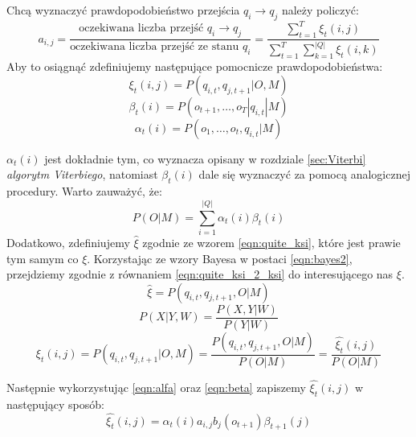 \documentclass[11pt]{article}
\begin{document}
	   Chcą wyznaczyć prawdopodobieństwo przejścia $q_i \rightarrow q_j$ należy policzyć:
	   \begin{equation}
		    a_{i,j}=\frac{\text{oczekiwana liczba przejść } q_i \rightarrow q_j}{\text{oczekiwana liczba przejść ze stanu } q_i} = \frac{\sum_{t=1}^T 	\xi_t(i,j)}{\sum_{t=1}^T \sum_{k=1}^{|Q|}	\xi_t(i,k)}
		    \label{eqn:qi_qj}
	   \end{equation}
	   Aby to osiągnąć zdefiniujemy następujące pomocnicze prawdopodobieństwa:
	   \begin{equation}
			\xi_t(i,j)=P(q_{i,t}, q_{j,t+1}|O,M)
			\label{eqn:ksi}
	   \end{equation}
	   \begin{equation}
	   	    \beta_t(i)=P(o_{t+1}, \ldots, o_T|q_{i,t}|M)
	   	    \label{eqn:beta}
	   \end{equation}
	   \begin{equation}
			\alpha_t(i)=P(o_1, \ldots, o_{t},q_{i,t}|M)
			\label{eqn:alfa}
	   \end{equation}
	   
	   $\alpha_t(i)$ jest dokładnie tym, co wyznacza opisany w rozdziale \ref{sec:Viterbi} \textit{algorytm Viterbiego}, natomiast $\beta_t(i)$ dale się wyznaczyć za pomocą analogicznej procedury. Warto zauważyć, że:
	   \begin{equation}
		   P(O|M) = \sum_{i=1}^{|Q|}\alpha_t(i)\beta_t(i)
	   \end{equation}
	   Dodatkowo, zdefiniujemy $\hat{\xi}$ zgodnie ze wzorem \ref{eqn:quite_ksi}, które jest prawie tym samym co $\xi$. Korzystając ze wzory Bayesa w postaci \ref{eqn:bayes2}, przejdziemy zgodnie z równaniem \ref{eqn:quite_ksi_2_ksi} do interesującego nas $\xi$.
	   \begin{equation}
	       \hat{\xi} = P(q_{i,t}, q_{j,t+1},O|M)
	       \label{eqn:quite_ksi}
	   \end{equation}
	   \begin{equation}
	        P(X|Y,W) = \frac{P(X,Y|W)}{P(Y|W)}
	        \label{eqn:bayes2}
	   \end{equation}
	   \begin{equation}
			\xi_t(i,j)=P(q_{i,t}, q_{j,t+1}|O,M) = \frac{P(q_{i,t}, q_{j,t+1},O|M)}{P(O|M)}= \frac{\hat{\xi_t}(i,j)}{P(O|M)}
			\label{eqn:quite_ksi_2_ksi}
		\end{equation}
		
		Następnie wykorzystując \ref{eqn:alfa} oraz \ref{eqn:beta} zapiszemy $\hat{\xi_t}(i,j)$ w następujący sposób:
		\begin{equation}
			\hat{\xi_t}(i,j) = \alpha_t(i) a_{i,j} b_j(o_{t+1}) \beta_{t+1}(j)
		\end{equation}
		
\end{document}
